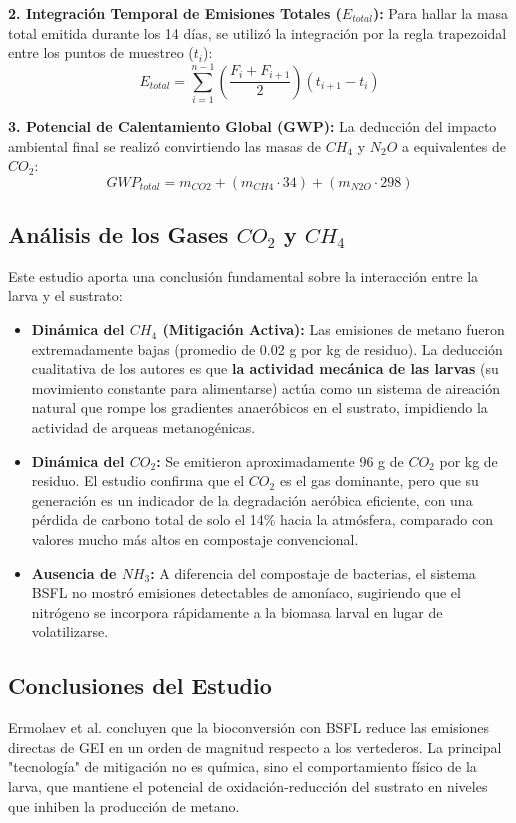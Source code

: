 \documentclass{article}
\begin{document}
\textbf{2. Integración Temporal de Emisiones Totales ($E_{total}$):}
Para hallar la masa total emitida durante los 14 días, se utilizó la integración por la regla trapezoidal entre los puntos de muestreo ($t_i$):
\begin{equation}
    E_{total} = \sum_{i=1}^{n-1} \left( \frac{F_i + F_{i+1}}{2} \right) (t_{i+1} - t_i)
\end{equation}

\textbf{3. Potencial de Calentamiento Global (GWP):}
La deducción del impacto ambiental final se realizó convirtiendo las masas de $CH_4$ y $N_2O$ a equivalentes de $CO_2$:
\begin{equation}
    GWP_{total} = m_{CO2} + (m_{CH4} \cdot 34) + (m_{N2O} \cdot 298)
\end{equation}

\subsection{Análisis de los Gases $CO_2$ y $CH_4$}
Este estudio aporta una conclusión fundamental sobre la interacción entre la larva y el sustrato:

\begin{itemize}
    \item \textbf{Dinámica del $CH_4$ (Mitigación Activa):} Las emisiones de metano fueron extremadamente bajas (promedio de 0.02 g por kg de residuo). La deducción cualitativa de los autores es que \textbf{la actividad mecánica de las larvas} (su movimiento constante para alimentarse) actúa como un sistema de aireación natural que rompe los gradientes anaeróbicos en el sustrato, impidiendo la actividad de arqueas metanogénicas.
    \item \textbf{Dinámica del $CO_2$:} Se emitieron aproximadamente 96 g de $CO_2$ por kg de residuo. El estudio confirma que el $CO_2$ es el gas dominante, pero que su generación es un indicador de la degradación aeróbica eficiente, con una pérdida de carbono total de solo el 14\% hacia la atmósfera, comparado con valores mucho más altos en compostaje convencional.
    \item \textbf{Ausencia de $NH_3$:} A diferencia del compostaje de bacterias, el sistema BSFL no mostró emisiones detectables de amoníaco, sugiriendo que el nitrógeno se incorpora rápidamente a la biomasa larval en lugar de volatilizarse.
\end{itemize}



\subsection{Conclusiones del Estudio}
Ermolaev et al. concluyen que la bioconversión con BSFL reduce las emisiones directas de GEI en un orden de magnitud respecto a los vertederos. La principal "tecnología" de mitigación no es química, sino el comportamiento físico de la larva, que mantiene el potencial de oxidación-reducción del sustrato en niveles que inhiben la producción de metano.
\end{document}
